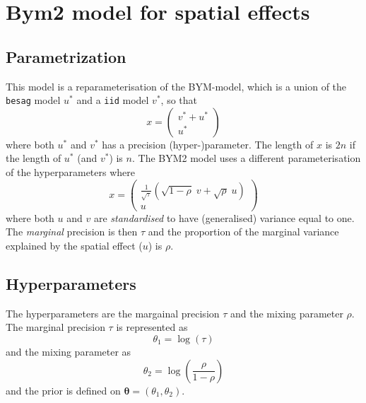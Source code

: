 \documentclass[a4paper,11pt]{article}
\begin{document}
\section*{Bym2 model for spatial effects}

\subsection*{Parametrization}

This model is a reparameterisation of the BYM-model, which is a union
of the \lstinline$besag$ model $u^{*}$ and a \lstinline$iid$ model $v^{*}$, so
that
\begin{displaymath}
    x =
    \begin{pmatrix}
        v^{*} + u^{*}\\
        u^{*}
    \end{pmatrix}
\end{displaymath}
where both $u^{*}$ and $v^{*}$ has a precision (hyper-)parameter.  The
length of $x$ is $2n$ if the length of $u^{*}$ (and $v^{*}$) is
$n$. The BYM2 model uses a different parameterisation of the
hyperparameters where
\begin{displaymath}
    x =
    \begin{pmatrix}
        \frac{1}{\sqrt{\tau}}\left(\sqrt{1-\rho} \;v + \sqrt{\rho} \;u\right)\\
        u
    \end{pmatrix}
\end{displaymath}
where both $u$ and $v$ are \emph{standardised} to have (generalised)
variance equal to one.  The \emph{marginal} precision is then $\tau$
and the proportion of the marginal variance explained by the spatial
effect ($u$) is $\rho$.

\subsection*{Hyperparameters}
The hyperparameters are the margainal precision $\tau$ and the mixing
parameter $\rho$.  The marginal precision $\tau$ is represented as
\begin{displaymath}
    \theta_{1} = \log(\tau)
\end{displaymath}
and the mixing parameter as
\begin{displaymath}
    \theta_{2} = \log\left(\frac{\rho}{1-\rho}\right)
\end{displaymath}
and the prior is defined on $\mathbf{\theta} = (\theta_{1}, \theta_{2})$.
\end{document}
